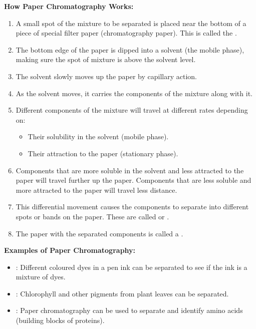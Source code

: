 \textbf{How Paper Chromatography Works:}
\begin{enumerate}
    \item A small spot of the mixture to be separated is placed near the bottom of a piece of special filter paper (chromatography paper). This is called the .
    \item The bottom edge of the paper is dipped into a solvent (the mobile phase), making sure the spot of mixture is above the solvent level.
    \item The solvent slowly moves up the paper by capillary action.
    \item As the solvent moves, it carries the components of the mixture along with it.
    \item Different components of the mixture will travel at different rates depending on:
        \begin{itemize}
            \item Their solubility in the solvent (mobile phase).
            \item Their attraction to the paper (stationary phase).
        \end{itemize}
    \item Components that are more soluble in the solvent and less attracted to the paper will travel further up the paper. Components that are less soluble and more attracted to the paper will travel less distance.
    \item This differential movement causes the components to separate into different spots or bands on the paper. These are called  or .
    \item The paper with the separated components is called a .
\end{enumerate}

\begin{example}
\textbf{Examples of Paper Chromatography:}
\begin{itemize}
    \item {}: Different coloured dyes in a pen ink can be separated to see if the ink is a mixture of dyes.
    \item {}: Chlorophyll and other pigments from plant leaves can be separated.
    \item {}: Paper chromatography can be used to separate and identify amino acids (building blocks of proteins).
\end{itemize}
\end{example}

